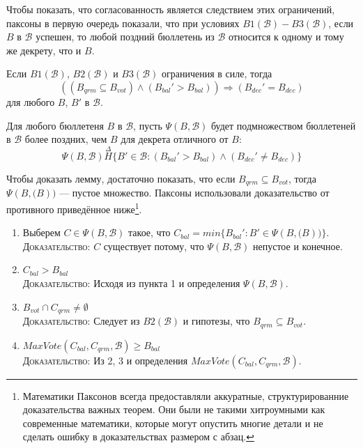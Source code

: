 \documentclass[12pt, a4paper]{article} %
\begin{document}
Чтобы показать, что согласованность является следствием этих ограничений, паксоны в первую очередь показали, что при условиях $B1(\mathcal{B}) - B3(\mathcal{B})$, если $B$ в $\mathcal{B}$ успешен, то любой поздний бюллетень из $\mathcal{B}$ относится к одному и тому же декрету, что и $B$.

\begin{lemma}
Если $B1(\mathcal{B})$, $B2(\mathcal{B})$ и $B3(\mathcal{B})$ ограничения в силе, тогда
\[
    ((B_{qrm} \subseteq B_{vot}) \land (B_{bal}' > B_{bal})) \Rightarrow (B_{dec}' = B_{dec})
\]
для любого $B$, $B'$ в $\mathcal{B}$.
\end{lemma}
\begin{lemmaproof}
Для любого бюллетеня $B$ в $\mathcal{B}$, пусть $\Psi(B, \mathcal{B})$ будет подмножеством бюллетеней в $\mathcal{B}$ более поздних, чем $B$ для декрета отличного от $B$:
\[
    \Psi(B, \mathcal{B}) \overset{\Delta}{H} \{B' \in \mathcal{B} : (B_{bal}' > B_{bal}) \land (B_{dec}' \neq B_{dec})\}
\]

Чтобы доказать лемму, достаточно показать, что если $B_{qrm} \subseteq B_{vot}$, тогда $\Psi(B, \mathcal(B))$ --- пустое множество. Паксоны использовали доказательство от противного приведённое ниже\footnote{Математики Паксонов всегда предоставляли аккуратные, структурированние доказательства важных теорем. Они были не такими хитроумными как современные математики, которые могут опустить многие детали и не сделать ошибку в доказательствах размером с абзац.}.
\begin{enumerate}
    \item Выберем $C \in \Psi(B, \mathcal{B})$ такое, что $C_{bal} = min \{B_{bal}' : B' \in \Psi(B, \mathcal(B))\}$. \\
          \textsc{Доказательство}: $C$ существует потому, что $\Psi(B, \mathcal{B})$ непустое и конечное.
    
    \item $C_{bal} > B_{bal}$\\
          \textsc{Доказательство}: Исходя из пункта 1 и определения $\Psi(B, \mathcal{B})$.

    \item $B_{vot} \cap C_{qrm} \neq \emptyset$\\
          \textsc{Доказательство}: Следует из  $B2(\mathcal{B})$ и гипотезы, что $B_{qrm} \subseteq B_{vot}$.
    
    \item $MaxVote(C_{bal}, C_{qrm}, \mathcal{B}) \geqslant B_{bal}$\\
          \textsc{Доказательство}: Из 2, 3 и определения $MaxVote(C_{bal}, C_{qrm}, \mathcal{B})$.


\end{enumerate}
\end{lemmaproof}
\end{document}
